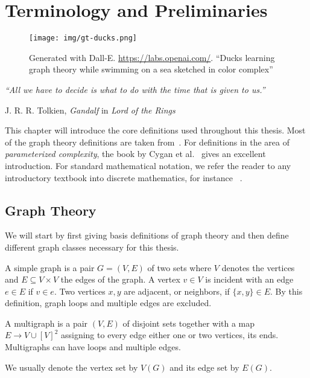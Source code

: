 \chapter{Terminology and Preliminaries}\label{ch:prelim}

\vspace*{-50pt}

\begin{figure}[ht]
        \texttt{[image: img/gt-ducks.png]}
        \captionsetup{textformat=empty,labelformat=blank}
        \caption[Generated with Dalle-E. Knowledge Cutoff 09-2022]{Generated with Dall-E. \url{https://labs.openai.com/}. ``Ducks learning graph theory while swimming on a sea sketched in color complex''}
\end{figure}

\epigraph{\itshape ``All we have to decide is what to do with the time that is given to us.''}{J. R. R. Tolkien, \textit{Gandalf} in \textit{Lord of the Rings}}


This chapter will introduce the core definitions used throughout this thesis. 
Most of the graph theory definitions are taken from~\cite{Diestel2010}. 
For definitions in the area of \textit{parameterized complexity}, the book by Cygan et al.~\cite{Cygan2015} gives an excellent introduction.
For standard mathematical notation, we refer the reader to any introductory textbook into discrete mathematics, for instance ~\cite{Rosen2012}.
\section{Graph Theory}
We will start by first giving basis definitions of graph theory and then define different graph classes necessary for this thesis.

\begin{definition}[Graph]
    A simple graph is a pair $G = (V, E)$ of two sets where $V$ denotes the vertices and $E \subseteq V \times V$ the edges of the graph.  A vertex $v \in V$ is incident with an edge $e \in E$ if $v \in e$. Two vertices $x, y$ are adjacent, or neighbors, if $\{x,y \} \in E$. By this definition, graph loops and multiple edges are excluded.
    
    A multigraph is a pair $(V, E)$ of disjoint sets together with a map $E \rightarrow V \cup [V]^2$ assigning to every edge either one or two vertices, its ends. Multigraphs can have loops and multiple edges.
    
    We usually denote the vertex set by $V(G)$ and its edge set by $E(G)$.
\end{definition}

